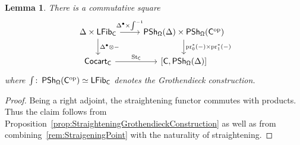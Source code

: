 \documentclass[reqno]{amsart}
\numberwithin{equation}{subsection}
\theoremstyle{plain}
\newtheorem{lemma}[equation]{Lemma}
\theoremstyle{definition}
\DeclareMathOperator{\IPSh}{\mathsf{PSh}}
\DeclareMathOperator{\ICocart}{\mathsf{Cocart}}
\DeclareMathOperator{\ILFib}{\mathsf{LFib}}
\DeclareMathOperator{\pr}{pr}
\DeclareMathOperator{\St}{St}
\newcommand{\op}{\mathrm{op}}
\newcommand{\I}[1]{\mathsf{#1}}
\renewcommand{\smallint}{\textstyle\int}
\newcommand{\iFun}[2]{{[#1,#2]}}
\begin{document}
\begin{lemma}
	\label{lem:straighteningTensoringCommute}
	There is a commutative square 
	\begin{equation*}
	\begin{tikzcd}
	\Delta\times\ILFib_{\I{C}}\arrow[d, "\Delta^\bullet\otimes -"]\arrow[r, "\Delta^\bullet\times\int^{-1}"] & \IPSh_{\Univ}(\Delta)\times\IPSh_{\Univ}(\I{C}^{\op})\arrow[d, "\pr_0^\ast(-)\times\pr_1^\ast(-)"]\\
	\ICocart_{\I{C}}\arrow[r, "\St_{\I{C}}"] & \iFun{\I{C}}{\IPSh_{\Univ}(\Delta)}
	\end{tikzcd}
	\end{equation*}
	where $\smallint\colon \IPSh_{\Univ}(\I{C}^{\op})\simeq\ILFib_{\I{C}}$ denotes the Grothendieck construction.
\end{lemma}
\begin{proof}
	Being a right adjoint, the straightening functor commutes with products. Thus the claim follows from Proposition~\ref{prop:StraighteningGrothendieckConstruction} as well as from combining~\ref{rem:StraigeningPoint} with the naturality of straightening.
\end{proof}
\end{document}
